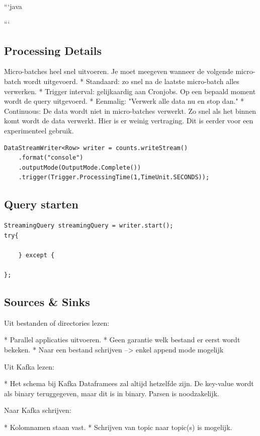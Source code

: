 \documentclass[a4paper,10pt,twoside]{report}
\begin{document}
```java

```

\subsection{Processing Details}

Micro-batches heel snel uitvoeren. Je moet meegeven wanneer de volgende micro-batch wordt uitgevoerd. 
* Standaard: zo snel na de laatste micro-batch alles verwerken.
* Trigger interval: gelijkaardig aan Cronjobs. Op een bepaald moment wordt de query uitgevoerd.
* Eenmalig: "Verwerk alle data nu en stop dan."
* Continuous: De data wordt niet in micro-batches verwerkt. Zo snel als het binnen komt wordt de data verwerkt. Hier is er weinig vertraging. Dit is eerder voor een experimenteel gebruik.

\begin{lstlisting}
DataStreamWriter<Row> writer = counts.writeStream()
	.format("console")
	.outputMode(OutputMode.Complete())
	.trigger(Trigger.ProcessingTime(1,TimeUnit.SECONDS));
\end{lstlisting}


\subsection{Query starten}

\begin{lstlisting}
StreamingQuery streamingQuery = writer.start();
try{
	
	} except {
	
};
\end{lstlisting}

\subsection{Sources \& Sinks}

Uit bestanden of directories lezen:

* Parallel applicaties uitvoeren.
* Geen garantie welk bestand er eerst wordt bekeken.
* Naar een bestand schrijven --> enkel append mode mogelijk

Uit Kafka lezen:

* Het schema bij Kafka Dataframees zal altijd hetzelfde zijn. De key-value wordt als binary teruggegeven, maar dit is in binary. Parsen is noodzakelijk.

Naar Kafka schrijven:

* Kolomnamen staan vast. 
* Schrijven van topic naar topic(s) is mogelijk.
\end{document}
